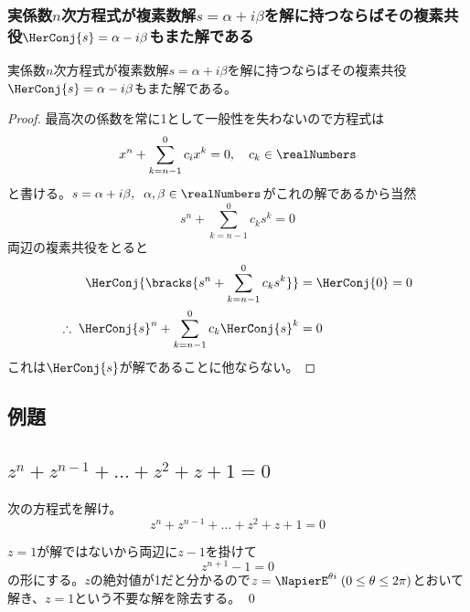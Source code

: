             \subsubsection{実係数\texorpdfstring{$n$}{n}次方程式が複素数解\texorpdfstring{$s=\alpha+i\beta$}{s=α+iβ}を解に持つならばその複素共役\texorpdfstring{$\HerConj{s} = \alpha-i\beta$}{}もまた解である}
                \begin{shadebox}
                    実係数$n$次方程式が複素数解$s=\alpha+i\beta$を解に持つならばその複素共役$\HerConj{s} = \alpha-i\beta$もまた解である。
                \end{shadebox}
                \begin{proof}
                    \quad\par
                    最高次の係数を常に1として一般性を失わないので方程式は
                    \[x^n + \sum_{k=n-1}^{0}{c_ix^k} = 0,\quad c_k \in \realNumbers\]
                    と書ける。$s=\alpha+i\beta,\;\;\alpha,\beta\in\realNumbers$がこれの解であるから当然
                    \[s^n + \sum_{k=n-1}^{0}{c_ks^k} = 0\]
                    両辺の複素共役をとると
                    \begin{align*}
                        \HerConj{\bracks{s^n + \sum_{k=n-1}^{0}{c_ks^k}}} &= \HerConj{0} = 0\\
                        \therefore \; {\HerConj{s}}^n + \sum_{k=n-1}^{0}{c_k{\HerConj{s}}^k} &= 0
                    \end{align*}
                    これは$\HerConj{s}$が解であることに他ならない。
                \end{proof}
        \subsection{例題}
            \subsection{\texorpdfstring{$z^n+z^{n-1}+\dots+z^2+z+1 = 0$}{zのべき乗の和=0}}
                \begin{shadebox}
                    次の方程式を解け。
                    \[z^n+z^{n-1}+\dots+z^2+z+1 = 0\]
                \end{shadebox}
                \begin{solution}
                    \quad\par
                    $z=1$が解ではないから両辺に$z-1$を掛けて
                    \[z^{n+1}-1=0\]
                    の形にする。$z$の絶対値が1だと分かるので$z=\NapierE^{\theta i}\; (0\leq\theta \leq 2\pi)$とおいて解き、$z=1$という不要な解を除去する。
                    \qed
                \end{solution}